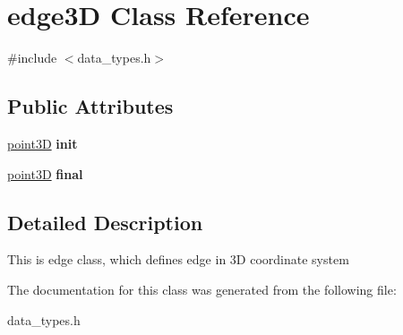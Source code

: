 \hypertarget{classedge3_d}{}\section{edge3D Class Reference}
\label{classedge3_d}


{\ttfamily \#include $<$data\+\_\+types.\+h$>$}

\subsection*{Public Attributes}
\begin{DoxyCompactItemize}
\item 
\mbox{\label{classedge3_d_a664feee4b35c5bb11de84a3695e4330f}} 
\mbox{\hyperlink{classpoint3_d}{point3D}} {\bfseries init}
\item 
\mbox{\label{classedge3_d_ad2df371c3546d39862af3c481952f25c}} 
\mbox{\hyperlink{classpoint3_d}{point3D}} {\bfseries final}
\end{DoxyCompactItemize}


\subsection{Detailed Description}
This is edge class, which defines edge in 3D coordinate system 

The documentation for this class was generated from the following file\+:\begin{DoxyCompactItemize}
\item 
data\+\_\+types.\+h\end{DoxyCompactItemize}
